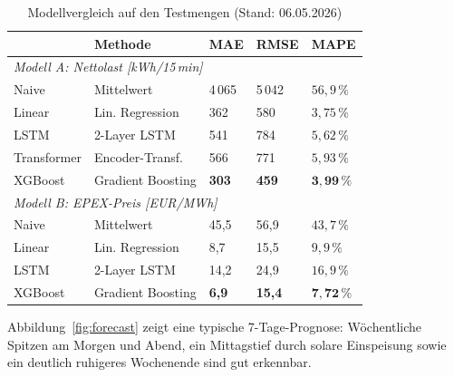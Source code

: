 \documentclass[sigconf]{acmart}
\begin{document}
\begin{table}[t]
  \caption{Modellvergleich auf den Testmengen (Stand: 06.05.2026)}
  \label{tab:results}
  \small
  \setlength{\tabcolsep}{4pt}
  \begin{tabular}{@{}lllll@{}}
    \toprule
    & Methode & MAE & RMSE & MAPE \\
    \midrule
    \multicolumn{5}{l}{\textit{Modell A: Nettolast {[}kWh/15\,min{]}}} \\
    Naive       & Mittelwert        & 4\,065 & 5\,042 & $56{,}9\,\%$ \\
    Linear      & Lin. Regression   & 362    & 580    & $3{,}75\,\%$ \\
    LSTM        & 2-Layer LSTM      & 541    & 784    & $5{,}62\,\%$ \\
    Transformer & Encoder-Transf.   & 566    & 771    & $5{,}93\,\%$ \\
    XGBoost     & Gradient Boosting & \textbf{303} & \textbf{459} & $\mathbf{3{,}99\,\%}$ \\
    \midrule
    \multicolumn{5}{l}{\textit{Modell B: EPEX-Preis {[}EUR/MWh{]}}} \\
    Naive   & Mittelwert        & 45{,}5 & 56{,}9 & $43{,}7\,\%$ \\
    Linear  & Lin. Regression   &  8{,}7 & 15{,}5 &  $9{,}9\,\%$ \\
    LSTM    & 2-Layer LSTM      & 14{,}2 & 24{,}9 & $16{,}9\,\%$ \\
    XGBoost & Gradient Boosting & \textbf{6{,}9} & \textbf{15{,}4} & $\mathbf{7{,}72\,\%}$ \\
    \bottomrule
  \end{tabular}
\end{table}

Abbildung~\ref{fig:forecast} zeigt eine typische 7-Tage-Prognose:
W\"ochentliche Spitzen am Morgen und Abend, ein Mittagstief
durch solare Einspeisung sowie ein deutlich ruhigeres Wochenende
sind gut erkennbar.
\end{document}
